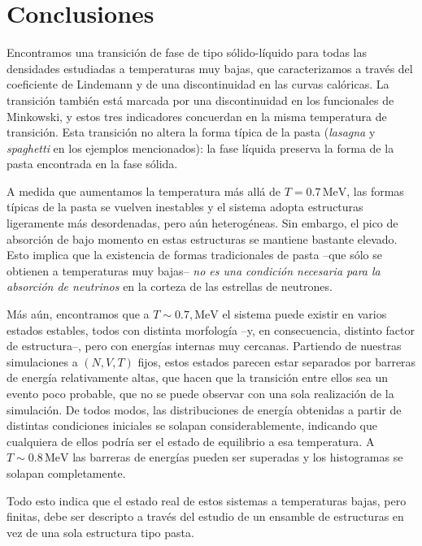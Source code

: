 \section{Conclusiones}
\label{discussion}

Encontramos una transición de fase de tipo sólido-líquido para todas las densidades estudiadas a temperaturas muy bajas, que caracterizamos a través del coeficiente de Lindemann y de una discontinuidad en las curvas calóricas.
La transición también está marcada por una discontinuidad en los funcionales de Minkowski, y estos tres indicadores concuerdan en la misma temperatura de transición.
Esta transición no altera la forma típica de la pasta (\emph{lasagna} y \emph{spaghetti}
en los ejemplos mencionados): la fase líquida preserva la forma de la pasta encontrada en la fase sólida.

A medida que aumentamos la temperatura más allá de $T=0.7\,\text{MeV}$, las formas típicas de la pasta se vuelven inestables y el sistema adopta estructuras ligeramente más desordenadas, pero aún heterogéneas.
Sin embargo, el pico de absorción de bajo momento en estas estructuras se mantiene bastante elevado.
Esto implica que la existencia de formas tradicionales de pasta --que sólo se obtienen a temperaturas muy bajas-- \emph{no es una condición necesaria para la absorción de neutrinos} en la corteza de las estrellas de neutrones.

Más aún, encontramos que a $T\sim0.7,\text{MeV}$ el sistema puede existir en varios estados estables, todos con distinta morfología --y, en consecuencia, distinto factor de estructura--, pero con energías internas muy cercanas.
Partiendo de nuestras simulaciones a $(N,V,T)$ fijos, estos estados parecen estar separados por barreras de energía relativamente altas, que hacen que la transición entre ellos sea un evento poco probable, que no se puede observar con una sola realización de la simulación.
De todos modos, las distribuciones de energía obtenidas a partir de distintas condiciones iniciales se solapan considerablemente, indicando que cualquiera de ellos podría ser el estado de equilibrio a esa temperatura.
A $T\sim0.8\,\text{MeV}$ las barreras de energías pueden ser superadas y los histogramas se solapan completamente.

Todo esto indica que el estado real de estos sistemas a temperaturas bajas, pero finitas, debe ser descripto a través del estudio de un ensamble de estructuras en vez de una sola estructura tipo pasta.
